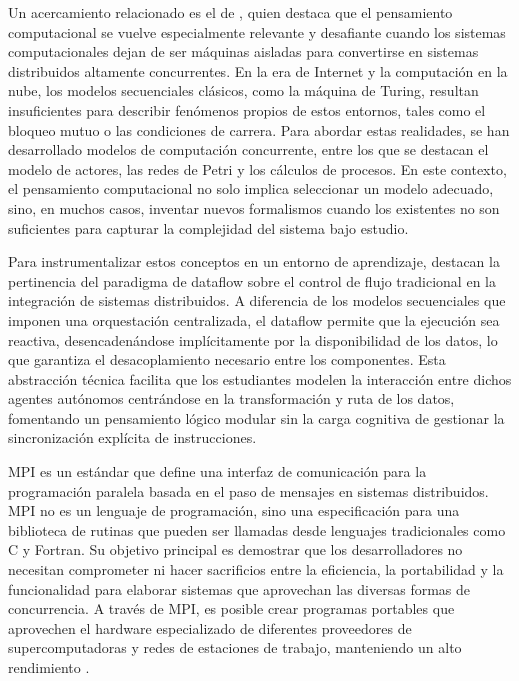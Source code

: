 Un acercamiento relacionado es el de , quien destaca que el pensamiento computacional se vuelve especialmente relevante y desafiante cuando los sistemas computacionales dejan de ser máquinas aisladas para convertirse en sistemas distribuidos altamente concurrentes. En la era de Internet y la computación en la nube, los modelos secuenciales clásicos, como la máquina de Turing, resultan insuficientes para describir fenómenos propios de estos entornos, tales como el bloqueo mutuo o las condiciones de carrera. Para abordar estas realidades, se han desarrollado modelos de computación concurrente, entre los que se destacan el modelo de actores, las redes de Petri y los cálculos de procesos. En este contexto, el pensamiento computacional no solo implica seleccionar un modelo adecuado, sino, en muchos casos, inventar nuevos formalismos cuando los existentes no son suficientes para capturar la complejidad del sistema bajo estudio.

Para instrumentalizar estos conceptos en un entorno de aprendizaje,  destacan la pertinencia del paradigma de dataflow sobre el control de flujo tradicional en la integración de sistemas distribuidos. A diferencia de los modelos secuenciales que imponen una orquestación centralizada, el dataflow permite que la ejecución sea reactiva, desencadenándose implícitamente por la disponibilidad de los datos, lo que garantiza el desacoplamiento necesario entre los componentes. Esta abstracción técnica facilita que los estudiantes modelen la interacción entre dichos agentes autónomos centrándose en la transformación y ruta de los datos, fomentando un pensamiento lógico modular sin la carga cognitiva de gestionar la sincronización explícita de instrucciones.


MPI es un estándar que define una interfaz de comunicación para la programación paralela basada en el paso de mensajes en sistemas distribuidos. MPI no es un lenguaje de programación, sino una especificación para una biblioteca de rutinas que pueden ser llamadas desde lenguajes tradicionales como C y Fortran. Su objetivo principal es demostrar que los desarrolladores no necesitan comprometer ni hacer sacrificios entre la eficiencia, la portabilidad y la funcionalidad para elaborar sistemas que aprovechan las diversas formas de concurrencia. A través de MPI, es posible crear programas portables que aprovechen el hardware especializado de diferentes proveedores de supercomputadoras y redes de estaciones de trabajo, manteniendo un alto rendimiento \cite{groppmpi2014}.

